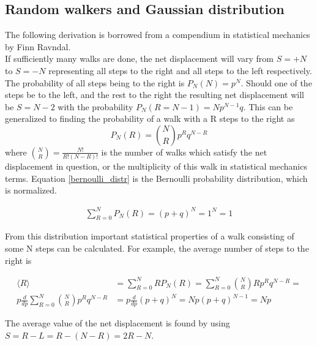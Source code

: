 \subsection{Random walkers and Gaussian distribution}\label{further_introduction}
The following derivation is borrowed from a compendium in statistical mechanics by Finn Ravndal. \\
If sufficiently many walks are done, the net displacement will vary from $S=+N$ to $S=-N$ representing all steps to the right and all steps to the left respectively. 
The probability of all steps being to the right is $P_N(N) = p^N$. 
Should one of the steps be to the left, and the rest to the right the resulting net displacement will be $S = N-2$ with the probability $P_N(R = N-1) = Np^{N-1}q$. 
This can be generalized to finding the probability of a walk with a R steps to the right as 
\begin{equation}\label{bernoulli_distr}
 P_N(R) = {N\choose R}p^{R}q^{N-R}
\end{equation}
where ${N\choose R}=\frac{N!}{R!(N-R)!}$ is the number of walks which satisfy the net displacement in question, or the multiplicity of this walk in statistical mechanics terms. 
Equation \ref{bernoulli_distr} is the Bernoulli probability distribution, which is normalized.

\begin{align*}
 \sum\limits_{R=0}^N P_N(R) = (p+q)^N = 1^N = 1
\end{align*}

From this distribution important statistical properties of a walk consisting of some N steps can be calculated.
For example, the average number of steps to the right is

\begin{align*}
 \langle R\rangle &=  \sum\limits_{R=0}^N RP_N(R) =  \sum\limits_{R=0}^N {N\choose R}Rp^Rq^{N-R} = \\
 p\frac{d}{dp} \sum\limits_{R=0}^N {N\choose R}p^Rq^{N-R} &= p\frac{d}{dp}(p+q)^N = Np(p+q)^{N-1} = Np
\end{align*}

The average value of the net displacement is found by using $S = R-L = R-(N-R) = 2R-N$.

